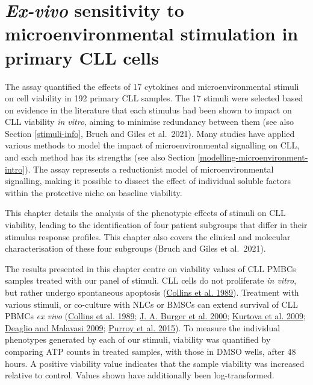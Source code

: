 \documentclass[11pt, a4paper, twosided]{book}
\begin{document}
\hypertarget{chapter4}{%
\chapter{\texorpdfstring{\emph{Ex-vivo} sensitivity to microenvironmental stimulation in primary CLL cells}{Ex-vivo sensitivity to microenvironmental stimulation in primary CLL cells}}\label{chapter4}}

The assay quantified the effects of 17 cytokines and microenvironmental stimuli on cell viability in 192 primary CLL samples. The 17 stimuli were selected based on evidence in the literature that each stimulus had been shown to impact on CLL viability \emph{in vitro}, aiming to minimise redundancy between them (see also Section \ref{stimuli-info}, Bruch and Giles et al.~2021). Many studies have applied various methods to model the impact of microenvironmental signalling on CLL, and each method has its strengths (see also Section \ref{modelling-microenvironment-intro}). The assay represents a reductionist model of microenvironmental signalling, making it possible to dissect the effect of individual soluble factors within the protective niche on baseline viability.

This chapter details the analysis of the phenotypic effects of stimuli on CLL viability, leading to the identification of four patient subgroups that differ in their stimulus response profiles. This chapter also covers the clinical and molecular characterisation of these four subgroups (Bruch and Giles et al.~2021).

The results presented in this chapter centre on viability values of CLL PMBCs samples treated with our panel of stimuli. CLL cells do not proliferate \emph{in vitro}, but rather undergo spontaneous apoptosis (\protect\hyperlink{ref-Collins1989}{Collins et al. 1989}). Treatment with various stimuli, or co-culture with NLCs or BMSCs can extend survival of CLL PBMCs \emph{ex vivo} (\protect\hyperlink{ref-Collins1989}{Collins et al. 1989}; \protect\hyperlink{ref-Burger2000}{J. A. Burger et al. 2000}; \protect\hyperlink{ref-Kurtova2009}{Kurtova et al. 2009}; \protect\hyperlink{ref-Deaglio2009}{Deaglio and Malavasi 2009}; \protect\hyperlink{ref-Purroy2015}{Purroy et al. 2015}). To measure the individual phenotypes generated by each of our stimuli, viability was quantified by comparing ATP counts in treated samples, with those in DMSO wells, after 48 hours. A positive viability value indicates that the sample viability was increased relative to control. Values shown have additionally been log-transformed.
\end{document}
